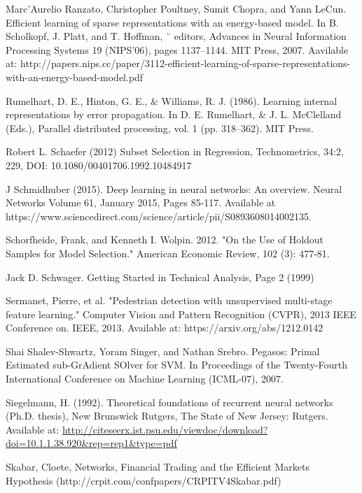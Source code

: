 \documentclass[a4paper,latin]{paper}
\begin{document}
\begin{thebibliography}{bibliography}
Marc’Aurelio Ranzato, Christopher Poultney, Sumit Chopra, and Yann LeCun. Efficient learning of sparse representations with an energy-based model. In B. Scholkopf, J. Platt, and T. Hoffman, ¨ editors, Advances in Neural Information Processing Systems 19 (NIPS’06), pages 1137–1144. MIT Press, 
2007. Aavilable at: http://papers.nips.cc/paper/3112-efficient-learning-of-sparse-representations-with-an-energy-based-model.pdf

Rumelhart, D. E., Hinton, G. E., \& Williams, R. J. (1986). Learning internal representations by error propagation. In D. E. Rumelhart, \& J. L. McClelland (Eds.), Parallel distributed processing, vol. 1 (pp. 318–362). MIT Press.

Robert L. Schaefer (2012) Subset Selection in Regression, Technometrics, 34:2, 229, DOI: 10.1080/00401706.1992.10484917
  
J Schmidhuber (2015). Deep learning in neural networks: An overview. Neural Networks Volume 61, January 2015, Pages 
85-117. Available at https://www.sciencedirect.com/science/article/pii/S0893608014002135. 
  
Schorfheide, Frank, and Kenneth I. Wolpin. 2012. "On the Use of Holdout Samples for Model Selection." American Economic Review, 102 (3): 477-81.

Jack D. Schwager. Getting Started in Technical Analysis, Page 2 (1999)


Sermanet, Pierre, et al. "Pedestrian detection with unsupervised multi-stage feature learning." Computer Vision and Pattern Recognition (CVPR), 2013 IEEE Conference on. IEEE, 2013.
Available at: https://arxiv.org/abs/1212.0142

Shai Shalev-Shwartz, Yoram Singer, and Nathan Srebro. Pegasos: Primal Estimated sub-GrAdient SOlver for SVM. In Proceedings of the Twenty-Fourth International Conference on Machine Learning (ICML-07), 2007.

Siegelmann, H. (1992). Theoretical foundations of recurrent neural networks (Ph.D. thesis), New Brunswick Rutgers, The State of New Jersey: Rutgers. Available at: \url{http://citeseerx.ist.psu.edu/viewdoc/download?doi=10.1.1.38.920&rep=rep1&type=pdf}

 Skabar, Cloete, Networks, Financial Trading and the Efficient Markets Hypothesis (http://crpit.com/confpapers/CRPITV4Skabar.pdf)


\end{thebibliography}
\end{document}
